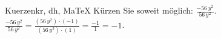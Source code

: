 \begin{MAufgabe}{Kuerzen}{kr, dh, MaTeX}
K\"urzen Sie soweit m\"oglich: $\frac{- 56\, y^2}{56\, y^2}$.\\ 
\ifLsg\MLoesung
\quad $\frac{- 56\, y^2}{56\, y^2}=\frac{(56\, y^2)\cdot(-1)}{(56\, y^2)\cdot(1)}=\frac{-1}{1}=-1$.\else\relax\fi
 \end{MAufgabe}